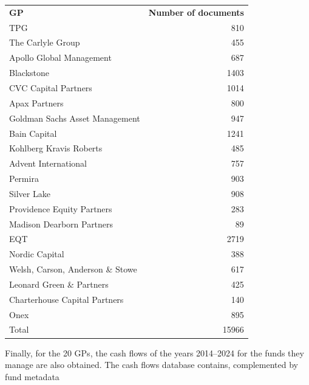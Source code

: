 \begin{table}[ht]
{\begin{tabular}{l r}
            \hline \\
            \hline
            \textbf{GP} & \textbf{Number of documents} \\
            \hline
            TPG & 810 \\
            The Carlyle Group & 455 \\
            Apollo Global Management & 687 \\
            Blackstone & 1403 \\
            CVC Capital Partners & 1014 \\
            Apax Partners & 800 \\
            Goldman Sachs Asset Management & 947 \\
            Bain Capital & 1241 \\
            Kohlberg Kravis Roberts & 485 \\
            Advent International & 757 \\
            Permira & 903 \\
            Silver Lake & 908 \\
            Providence Equity Partners & 283 \\
            Madison Dearborn Partners & 89 \\
            EQT & 2719 \\
            Nordic Capital & 388 \\
            Welsh, Carson, Anderson \& Stowe & 617 \\
            Leonard Green \& Partners & 425 \\
            Charterhouse Capital Partners & 140 \\
            Onex & 895 \\
            \hline
            Total & 15966 \\
            \hline
        \end{tabular}
        }
        \label{tab:num_of_docs}
    \end{table}
    Finally, for the 20 GPs, the cash flows of the years 2014--2024 for the funds they manage are also obtained.
    The cash flows database contains, complemented by fund metadata

